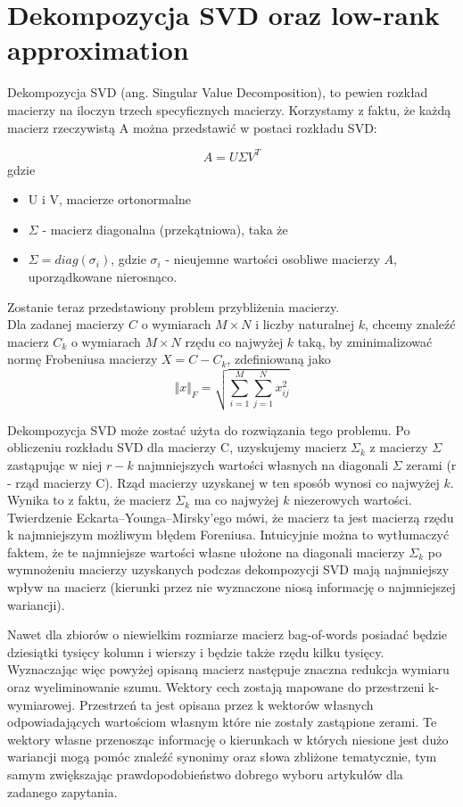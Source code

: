 \section{Dekompozycja SVD oraz low-rank approximation}
Dekompozycja SVD (ang. Singular Value Decomposition), to pewien rozkład macierzy na iloczyn trzech specyficznych macierzy. Korzystamy z faktu, że każdą macierz rzeczywistą A można przedstawić w postaci rozkładu SVD:

$$A=U\Sigma V ^T$$
gdzie
\begin{itemize}
\item U i V, macierze ortonormalne
\item $\Sigma$ -  macierz diagonalna (przekątniowa), taka że 
\item $\Sigma=diag(\sigma_i)$, gdzie $\sigma_i$ - nieujemne wartości osobliwe macierzy $A$, uporządkowane nierosnąco. 
\end{itemize}

Zostanie teraz przedstawiony problem przybliżenia macierzy.\\
Dla zadanej macierzy $C$ o wymiarach $M \times N$ i liczby naturalnej $k$, chcemy znaleźć macierz $C_k$ o wymiarach $M \times N$ rzędu co najwyżej $k$ taką, by zminimalizować normę Frobeniusa macierzy $X = C - C_k$, zdefiniowaną jako
$$\Vert x \Vert _{F} =\sqrt{ \sum \limits _{i=1}^{M} \sum \limits _{j=1}^{N} x^{2}_{ij}} $$

Dekompozycja SVD może zostać użyta do rozwiązania tego problemu. Po obliczeniu rozkładu SVD dla macierzy C, uzyskujemy macierz $\Sigma _k$ z macierzy $\Sigma$ zastąpując w niej $r-k$ najmniejszych wartości własnych na diagonali $\Sigma$ zerami (r - rząd macierzy C). Rząd macierzy uzyskanej w ten sposób wynosi co najwyżej $k$. Wynika to z faktu, że macierz $\Sigma _k$ ma co najwyżej $k$ niezerowych wartości.
Twierdzenie Eckarta–Younga–Mirsky'ego mówi, że macierz ta jest macierzą rzędu k najmniejszym możliwym błędem Foreniusa. Intuicyjnie można to wytłumaczyć faktem, że te najmniejsze wartości własne ułożone na diagonali macierzy $\Sigma _k$ po wymnożeniu macierzy uzyskanych podczas dekompozycji SVD mają najmniejszy wpływ na macierz (kierunki przez nie wyznaczone niosą informację o najmniejszej wariancji).

Nawet dla zbiorów o niewielkim rozmiarze macierz bag-of-words posiadać będzie dziesiątki tysięcy kolumn i wierszy i będzie także rzędu kilku tysięcy. Wyznaczając więc powyżej opisaną macierz następuje znaczna redukcja wymiaru oraz wyeliminowanie szumu. Wektory cech zostają mapowane do przestrzeni k-wymiarowej. Przestrzeń ta jest opisana przez k wektorów własnych odpowiadających wartościom własnym które nie zostały zastąpione zerami. Te wektory własne przenosząc informację o kierunkach w których niesione jest dużo wariancji mogą pomóc znaleźć synonimy oraz słowa zbliżone tematycznie, tym samym zwiększając prawdopodobieństwo dobrego wyboru artykułów dla zadanego zapytania.


